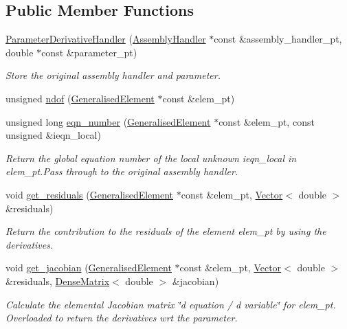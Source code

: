 \subsection*{Public Member Functions}
\begin{DoxyCompactItemize}
\item 
\hyperlink{classoomph_1_1ParameterDerivativeHandler_af9d8c24e7fdc34662086c66b759de2a6}{Parameter\+Derivative\+Handler} (\hyperlink{classoomph_1_1AssemblyHandler}{Assembly\+Handler} $\ast$const \&assembly\+\_\+handler\+\_\+pt, double $\ast$const \&parameter\+\_\+pt)
\begin{DoxyCompactList}\small\item\em Store the original assembly handler and parameter. \end{DoxyCompactList}\item 
unsigned \hyperlink{classoomph_1_1ParameterDerivativeHandler_a341d4e7cfaab7e66df43913d775a6871}{ndof} (\hyperlink{classoomph_1_1GeneralisedElement}{Generalised\+Element} $\ast$const \&elem\+\_\+pt)
\item 
unsigned long \hyperlink{classoomph_1_1ParameterDerivativeHandler_a359b3b627532773b4606db1989f9c844}{eqn\+\_\+number} (\hyperlink{classoomph_1_1GeneralisedElement}{Generalised\+Element} $\ast$const \&elem\+\_\+pt, const unsigned \&ieqn\+\_\+local)
\begin{DoxyCompactList}\small\item\em Return the global equation number of the local unknown ieqn\+\_\+local in elem\+\_\+pt.\+Pass through to the original assembly handler. \end{DoxyCompactList}\item 
void \hyperlink{classoomph_1_1ParameterDerivativeHandler_a8ba1dbc805c00ac75e6d5d53f1b014c1}{get\+\_\+residuals} (\hyperlink{classoomph_1_1GeneralisedElement}{Generalised\+Element} $\ast$const \&elem\+\_\+pt, \hyperlink{classoomph_1_1Vector}{Vector}$<$ double $>$ \&residuals)
\begin{DoxyCompactList}\small\item\em Return the contribution to the residuals of the element elem\+\_\+pt by using the derivatives. \end{DoxyCompactList}\item 
void \hyperlink{classoomph_1_1ParameterDerivativeHandler_a0bdfd879c1e63cc74923cf956b4f4310}{get\+\_\+jacobian} (\hyperlink{classoomph_1_1GeneralisedElement}{Generalised\+Element} $\ast$const \&elem\+\_\+pt, \hyperlink{classoomph_1_1Vector}{Vector}$<$ double $>$ \&residuals, \hyperlink{classoomph_1_1DenseMatrix}{Dense\+Matrix}$<$ double $>$ \&jacobian)
\begin{DoxyCompactList}\small\item\em Calculate the elemental Jacobian matrix \char`\"{}d equation 
/ d variable\char`\"{} for elem\+\_\+pt. Overloaded to return the derivatives wrt the parameter. \end{DoxyCompactList}\end{DoxyCompactItemize}
